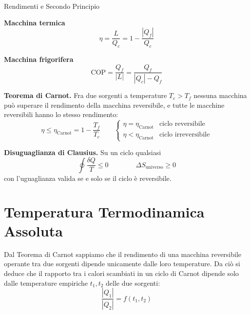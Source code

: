 \begin{formulario}{Rendimenti e Secondo Principio}
\begin{minipage}[t]{0.47\textwidth}
\textbf{Macchina termica}
\begin{equation*}
    \eta = \frac{L}{Q_c} = 1 - \frac{|Q_f|}{Q_c}
\end{equation*}
\end{minipage}
\hfill
\begin{minipage}[t]{0.47\textwidth}
\textbf{Macchina frigorifera}
\begin{equation*}
    \text{COP} = \frac{Q_f}{|L|} = \frac{Q_f}{|Q_c| - Q_f}
\end{equation*}
\end{minipage}
\vspace{6pt}

\textbf{Teorema di Carnot.} Fra due sorgenti a temperature $T_c > T_f$ nessuna macchina può superare
il rendimento della macchina reversibile, e tutte le macchine reversibili hanno lo stesso rendimento:
\begin{equation*}
    \eta \leq \eta_{\text{Carnot}} = 1 - \frac{T_f}{T_c}
    \qquad
    \begin{cases}
        \eta = \eta_{\text{Carnot}} & \text{ciclo reversibile} \\
        \eta < \eta_{\text{Carnot}} & \text{ciclo irreversibile}
    \end{cases}
\end{equation*}

\textbf{Disuguaglianza di Clausius.} Su un ciclo qualsiasi
\begin{equation*}
    \oint \frac{\delta Q}{T} \leq 0
    \qquad\qquad
    \Delta S_{\text{universo}} \geq 0
\end{equation*}
con l'uguaglianza valida se e solo se il ciclo è reversibile.
\end{formulario}

\section{Temperatura Termodinamica Assoluta}
Dal Teorema di Carnot sappiamo che il rendimento di una macchina reversibile operante tra due sorgenti dipende unicamente dalle loro temperature. Da ciò si deduce che il rapporto tra i calori scambiati in un ciclo di Carnot dipende solo dalle temperature empiriche $t_1, t_2$ delle due sorgenti:
\begin{equation*}
    \frac{|Q_1|}{|Q_2|} = f(t_1, t_2)
\end{equation*}

